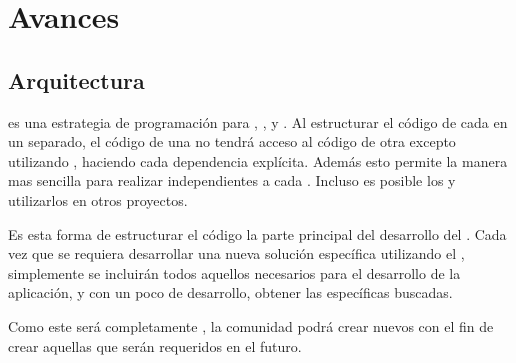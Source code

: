 \chapter{Avances}

\section{Arquitectura}

\packagesAS es una estrategia de programación para \codeSeparationQA, \modularityAS, y \reusabilityQA. Al estructurar el código de cada \featureCPT en un \packagesAS separado, el código de una \featureCPT no tendrá acceso al código de otra \featureCPT excepto utilizando \exportCPT, haciendo cada dependencia explícita. Además esto permite la manera mas sencilla para realizar \testingCPT independientes a cada \featureCPT. Incluso es posible \publishINT los \packagesAS y utilizarlos en otros proyectos.

Es esta forma de estructurar el código la parte principal del desarrollo del \frameworkPC \ecommerceCOM. Cada vez que se requiera desarrollar una nueva solución específica utilizando el \frameworkPC, simplemente se incluirán todos aquellos \modulesAS necesarios para el desarrollo de la aplicación, y con un poco de desarrollo, obtener las \featuresCPT específicas buscadas.

Como este \frameworkPC será completamente \openSourcePC, la comunidad podrá crear nuevos \modulesAS con el fin de crear aquellas \featuresCPT que serán requeridos en el futuro.



